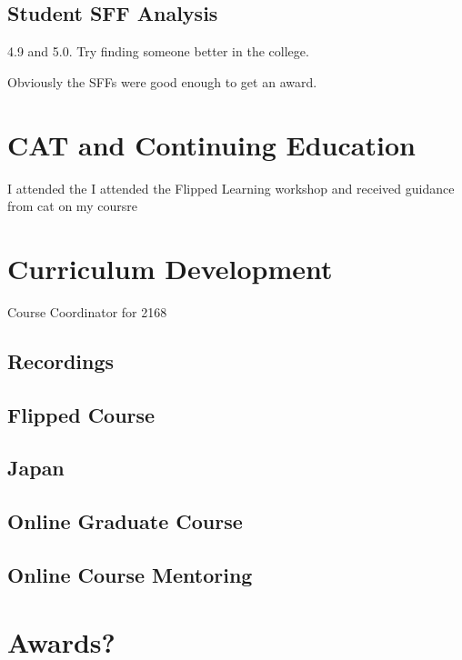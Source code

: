 \documentclass[]{article}
\begin{document}
\subsection{Student SFF Analysis}


4.9 and 5.0.  
Try finding someone better in the college.

Obviously the SFFs were good enough to get an award.
\section{CAT and Continuing Education}


I attended the
I attended the Flipped Learning workshop and received guidance from cat on my coursre
\section{Curriculum Development}
Course Coordinator for 2168


\subsection{Recordings}

\subsection{Flipped Course}

\subsection{Japan}

\subsection{Online Graduate Course}

\subsection{Online Course Mentoring}



\section{Awards?}
\end{document}
